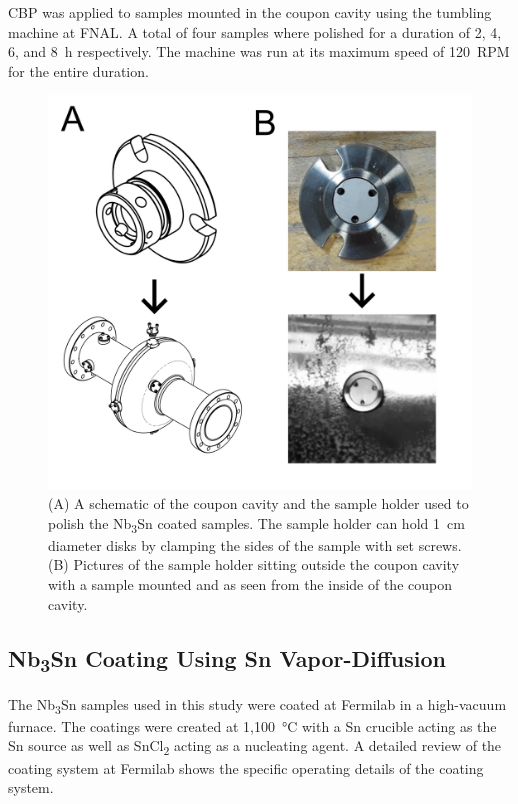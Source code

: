CBP was applied to samples mounted in the coupon cavity using the tumbling machine at FNAL. A total of four samples where polished for a duration of 2, 4, 6, and 8~\unit{\hour} respectively. The machine was run at its maximum speed of 120~RPM for the entire duration.
%


\begin{figure}[htb]%
\centering%
\includegraphics[width=\columnwidth]{../doc/figs/Coupon_Cavity.png}%
\caption{(A) A schematic of the coupon cavity and the sample holder used to polish the Nb\textsubscript{3}Sn coated samples. The sample holder can hold 1~cm diameter disks by clamping the sides of the sample with set screws. (B) Pictures of the sample holder sitting outside the coupon cavity with a sample mounted and as seen from the inside of the coupon cavity.}%
\label{fig:couponcavity}%
\end{figure}

%
\subsection{Nb\textsubscript{3}Sn Coating Using Sn Vapor-Diffusion}%
\label{subsec:nb3sncoating}%
The Nb\textsubscript{3}Sn samples used in this study were coated at Fermilab in a high-vacuum furnace. The coatings were created at 1,100~°C with a Sn crucible acting as the Sn source as well as SnCl\textsubscript{2} acting as a nucleating agent. A detailed review of the coating system at Fermilab shows the specific operating details of the coating system\cite{posen2017nb3sn}.

